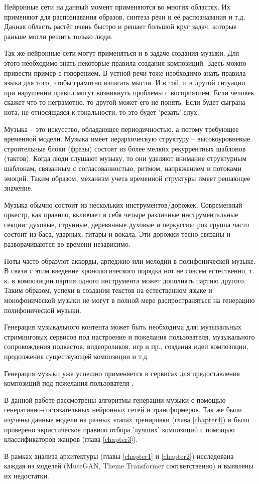 Нейронные сети на данный момент применяются во многих областях. Их применяют для распознавания образов, синтеза речи и её распознавания и т.д. Данная область растёт очень быстро и решает большой круг задач, которые раньше могли решить только люди. 

Так же нейронные сети могут применяться и в задаче создания музыки. Для этого необходимо знать некоторые правила создания композиций. Здесь можно привести пример с говорением. В устной речи тоже необходимо знать правила языка для того, чтобы грамотно излагать мысли. И в той, и в другой ситуации при нарушении правил могут возникнуть проблемы с восприятием. Если человек скажет что-то неграмотно, то другой может его не понять. Если будет сыграна нота, не относящаяся к тональности, то это будет 'резать' слух. 

Музыка -- это искусство, обладающее периодичностью, а потому требующее временной модели. Музыка имеет иерархическую структуру -- высокоуровневые строительные блоки (фразы) состоят из более мелких рекуррентных шаблонов (тактов). Когда люди слушают музыку, то они уделяют внимание структурным шаблонам, связанным с согласованностью, ритмом, напряжением и потоками эмоций. Таким образом, механизм учета временной структуры имеет решающее значение.

Музыка обычно состоит из нескольких инструментов/дорожек. Современный оркестр, как правило, включает в себя четыре различные инструментальные секции: духовые, струнные, деревянные духовые и перкуссия; рок группа часто состоит из баса, ударных, гитары и вокала. Эти дорожки тесно связаны и разворачиваются во времени независимо.

Ноты часто образуют аккорды, арпеджио или мелодии в полифонической музыке. В связи с этим введение хронологического порядка нот не совсем естественно, т. к. в композиции партия одного инструмента может дополнять партию другого. Таким образом, успехи в создании текстов на естественном языке и монофонической музыки не могут в полной мере распространяться на генерацию полифонической музыки.

Генерация музыкального контента может быть необходима для: музыкальных стриминговых сервисов под настроение и пожелания пользователя, музыкального сопровождения подкастов, видеороликов, игр и пр., создания идеи композиции, продолжения существующей композиции и т.д.

Генерация музыки уже успешно применяется в сервисах для предоставления композиций под пожелания пользователя \cite{brainfm}.

В данной работе рассмотрены алгоритмы генерации музыки с помощью генеративно-состязательных нейронных сетей и трансформеров. Так же были изучены данные модели на разных этапах тренировки (глава \ref{chapter4}) и было проверено эвристическое правило отбора 'лучших' композиций с помощью классификаторов жанров (глава \ref{chapter3}). 

В рамках анализа архитектуры (главы \ref{chapter1} и \ref{chapter2}) исследована каждая из моделей (MuseGAN, Theme Transformer соответственно) и выявлены их недостатки.
